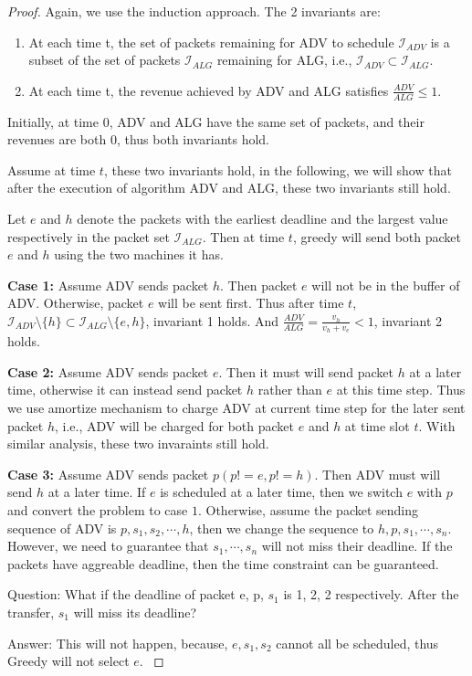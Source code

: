 \documentclass[10 pt,final]{article}
\newcommand{\answer}[1]{{\color{magenta} #1}}
\newcommand{\question}[1]{{\color{blue} #1}}
\begin{document}
\begin{proof} Again, we use the induction approach. The 2 invariants are:
\begin{enumerate}
\item At each time t, the set of packets remaining for ADV to schedule $\mathcal{I}_{ADV}$ is a subset of the set of packets $\mathcal{I}_{ALG}$ remaining for ALG, i.e., $\mathcal{I}_{ADV} \subset \mathcal{I}_{ALG}$.
\item At each time t, the revenue achieved by ADV and ALG satisfies $\frac{ADV}{ALG} \leq 1$.
\end{enumerate}

Initially, at time $0$, ADV and ALG have the same set of packets, and their revenues are both $0$, thus both invariants hold. 

Assume at time $t$, these two invariants hold, in the following, we will show that after the execution of algorithm ADV and ALG, these two invariants still hold. 

Let $e$ and $h$ denote the packets with the earliest deadline and the largest value respectively in the packet set $\mathcal{I}_{ALG}$. Then at time $t$, greedy will send both packet $e$ and $h$ using the two machines it has. 

\textbf{Case 1: } Assume ADV sends packet $h$. Then packet $e$ will not be in the buffer of ADV. Otherwise, packet $e$ will be sent first. Thus after time $t$, $\mathcal{I}_{ADV} \setminus \{h\}  \subset \mathcal{I}_{ALG} \setminus \{e,h\}$, invariant 1 holds. And $\frac{ADV}{ALG} = \frac{v_h}{v_h+v_e} < 1$, invariant 2 holds.

\textbf{Case 2:} Assume ADV sends packet $e$. Then it must will send packet $h$ at a later time, otherwise it can instead send packet $h$ rather than $e$ at this time step. Thus we use amortize mechanism to charge ADV at current time step for the later sent packet $h$, i.e., ADV will be charged for both packet $e$ and $h$ at time slot $t$. With similar analysis, these two invaraints still hold.

\textbf{Case 3:} Assume ADV sends packet $p (p!=e, p!=h)$. Then ADV must will send $h$ at a later time. If $e$ is scheduled at a later time, then we switch $e$ with $p$ and convert the problem to case $1$. Otherwise, assume the packet sending sequence of ADV is $p,s_1,s_2,\cdots,h$, then we change the sequence to $h,p,s_1,\cdots,s_n$. However, we need to guarantee that $s_1, \cdots, s_n$ will not miss their deadline. If the packets have aggreable deadline, then the time constraint can be guaranteed.

\question{Question: What if the deadline of packet e, p, $s_1$ is 1, 2, 2 respectively. After the transfer, $s_1$ will miss its deadline?} 

\answer{Answer: This will not happen, because, $e, s_1, s_2$ cannot all be scheduled, thus Greedy will not select $e$. }
\end{proof}
\end{document}
